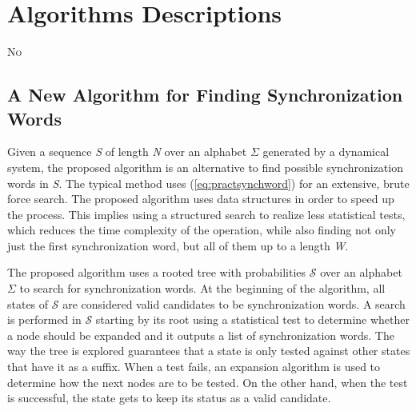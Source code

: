 \chapter{Algorithms Descriptions}\label{cap:3}



{\lettrine[loversize=0.25,findent=0.2em,nindent=0em]{N}{o}

\section{A New Algorithm for Finding Synchronization Words}

Given a sequence \textit{S} of length \textit{N} over an alphabet $\Sigma$ generated by a dynamical system, the proposed algorithm is an alternative to find possible synchronization words in \textit{S}. The typical method uses (\ref{eq:practsynchword}) for an extensive, brute force search.  The proposed algorithm uses data structures in order to speed up the process. This implies using a structured search to realize less statistical tests, which reduces the time complexity of the operation, while also finding not only just the first synchronization word, but all of them up to a length \textit{W}.

The proposed algorithm uses a rooted tree with probabilities $\mathcal{S}$ over an alphabet $\Sigma$ to search for synchronization words. At the beginning of the algorithm, all states of $\mathcal{S}$ are considered valid candidates to be synchronization words. A search is performed in $\mathcal{S}$ starting by its root using a statistical test to determine whether a node should be expanded and it outputs a list of synchronization words. The way the tree is explored guarantees that a state is only tested against other states that have it as a suffix. When a test fails, an expansion algorithm is used to determine how the next nodes are to be tested. On the other hand, when the test is successful, the state gets to keep its status as a valid candidate.

}
